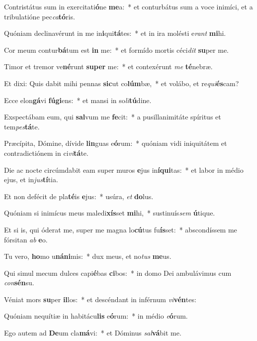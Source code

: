 \item Contristátus sum in exercitati\textbf{ó}ne \textbf{me}a:~* et conturbátus sum a voce inimíci, et a tribulatióne pec\textit{ca}\textbf{tó}ris.
\item Quóniam declinavérunt in me in\textbf{i}qui\textbf{tá}tes:~* et in ira molésti e\textit{rant} \textbf{mi}hi.
\item Cor meum contur\textbf{bá}tum est \textbf{in} me:~* et formído mortis céci\textit{dit} \textbf{su}per me.
\item Timor et tremor ve\textbf{né}runt \textbf{su}\textbf{per} me:~* et contexérunt \textit{me} \textbf{té}nebræ.
\item Et dixi: Quis dabit mihi pennas \textbf{sic}ut co\textbf{lúm}bæ,~* et volábo, et re\textit{qui}\textbf{és}cam?
\item Ecce elon\textbf{gá}vi \textbf{fú}\textbf{gi}ens:~* et mansi in so\textit{li}\textbf{tú}dine.
\item Exspectábam eum, qui \textbf{sal}vum me \textbf{fe}cit:~* a pusillanimitáte spíritus et tem\textit{pes}\textbf{tá}te.
\item Præcípita, Dómine, dívide \textbf{lin}guas e\textbf{ó}rum:~* quóniam vidi iniquitátem et contradictiónem in ci\textit{vi}\textbf{tá}te.
\item Die ac nocte circúmdabit eam super muros \textbf{e}jus in\textbf{í}\textbf{qui}tas:~* et labor in médio ejus, et in\textit{jus}\textbf{tí}tia.
\item Et non defécit de pla\textbf{té}is \textbf{e}jus:~* usúra, \textit{et} \textbf{do}lus.
\item Quóniam si inimícus meus maledi\textbf{xís}set \textbf{mi}hi,~* sustinuís\textit{sem} \textbf{ú}tique.
\item Et si is, qui óderat me, super me magna lo\textbf{cú}tus fu\textbf{ís}set:~* abscondíssem me fórsitan \textit{ab} \textbf{e}o.
\item Tu vero, \textbf{ho}mo u\textbf{ná}\textbf{ni}mis:~* dux meus, et no\textit{tus} \textbf{me}us.
\item Qui simul mecum dulces capi\textbf{é}bas \textbf{ci}bos:~* in domo Dei ambulávimus cum \textit{con}\textbf{sén}su.
\item Véniat mors \textbf{su}per \textbf{il}los:~* et descéndant in inférnum \textit{vi}\textbf{vén}tes:
\item Quóniam nequítiæ in habitácu\textbf{lis} e\textbf{ó}rum:~* in médio \textit{e}\textbf{ó}rum.
\item Ego autem ad \textbf{De}um cla\textbf{má}vi:~* et Dóminus \textit{sal}\textbf{vá}bit me.

